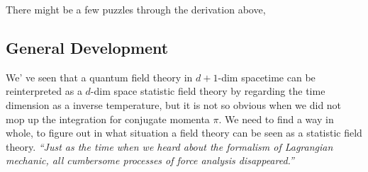 There might be a few puzzles through the derivation above, 

\subsection{General Development}
We' ve seen that a quantum field theory in $d+1$-dim spacetime can be reinterpreted as a $d$-dim space statistic field theory by regarding the time dimension as a inverse temperature, but it is not so obvious when we did not mop up the integration for conjugate momenta $\pi$. We need to find a way in whole, to figure out in what situation a field theory can be seen as a statistic field theory. \emph{``Just as the time when we heard about the formalism of Lagrangian mechanic, all cumbersome processes of force analysis disappeared.''}